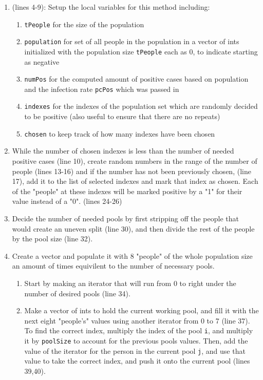 \documentclass[letterpaper, 10pt]{article}
\begin{document}
\begin{enumerate}
    \item (lines 4-9): Setup the local variables for this method including:
        \begin{enumerate}
            \item \texttt{tPeople} for the size of the population
            \item \texttt{population} for set of all people in the population in a vector of ints initialized with the population size \texttt{tPeople} each as 0, to indicate starting as negative
            \item \texttt{numPos} for the computed amount of positive cases based on population and the infection rate \texttt{pcPos} which was passed in
            \item \texttt{indexes} for the indexes of the population set which are randomly decided to be positive (also useful to ensure that there are no repeats)
            \item \texttt{chosen} to keep track of how many indexes have been chosen
        \end{enumerate}
    \item While the number of chosen indexes is less than the number of needed positive cases (line 10), create random numbers in the range of the number of people (lines 13-16) and if the number has not been previously chosen, (line 17), add it to the list of selected indexes and mark that index as chosen. Each of the "people" at these indexes will be marked positive by a "1" for their value instead of a "0". (lines 24-26)
    \item Decide the number of needed pools by first stripping off the people that would create an uneven split (line 30),  and then divide the rest of the people by the pool size (line 32).
    \item Create a vector and populate it with 8 "people" of the whole population size an amount of times equivilent to the number of necessary pools. 
        \begin{enumerate}
            \item Start by making an iterator that will run from 0 to right under the number of desired pools (line 34).
            \item Make a vector of ints to hold the current working pool, and fill it with the next eight "people's" values using another iterator from 0 to 7 (line 37). To find the correct index, multiply the index of the pool \texttt{i},  and multiply it by \texttt{poolSize} to account for the previous pools values. Then, add the value of the iterator for the person in the current pool \texttt{j}, and use that value to take the correct index, and push it onto the current pool (lines 39,40).

\end{enumerate}
\end{enumerate}
\end{document}
